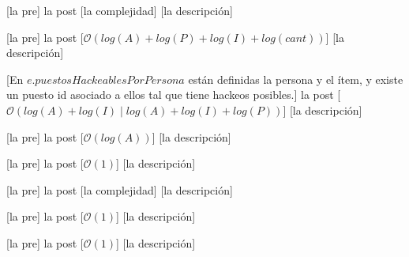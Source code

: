 \begin{Interfaz}
    [la pre]
    {la post}
    [la complejidad]
    [la descripción]
    
    [la pre]
    {la post}
    [$\mathcal{O}(log(A)+log(P)+log(I)+log(cant))$]
    [la descripción]
    
    [En $e.puestosHackeablesPorPersona$ están definidas la persona y el ítem, y existe un puesto id asociado a ellos tal que tiene hackeos posibles.]
    {la post}
    [$\mathcal{O}(log(A)+log(I) \;|\; log(A)+log(I)+log(P))$]
    [la descripción]
    
    [la pre]
    {la post}
    [$\mathcal{O}(log(A))$]
    [la descripción]
    
    [la pre]
    {la post}
    [$\mathcal{O}(1)$]
    [la descripción]

    [la pre]
    {la post}
    [la complejidad]
    [la descripción]

    [la pre]
    {la post}
    [$\mathcal{O}(1)$]
    [la descripción]

    [la pre]
    {la post}
    [$\mathcal{O}(1)$]
    [la descripción]

\end{Interfaz}